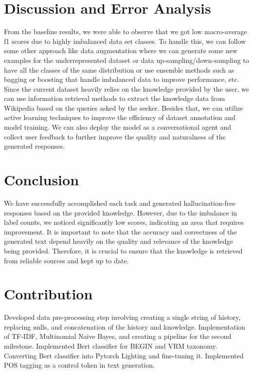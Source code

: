 \documentclass[11pt]{article}
\begin{document}
\section{Discussion and Error Analysis}
From the baseline results, we were able to observe that we got low macro-average f1 scores due to highly imbalanced data set classes. To handle this, we can follow some other approach like data augmentation where we can generate some new examples for the underrepresented dataset or data up-sampling/down-sampling to have all the classes of the same distribution or use ensemble methods such as bagging or boosting that handle imbalanced data to improve performance, etc. Since the current dataset heavily relies on the knowledge provided by the user, we can use information retrieval methods to extract the knowledge data from Wikipedia based on the queries asked by the seeker. Besides that, we can utilize active learning techniques to improve the efficiency of dataset annotation and model training. We can also deploy the model as a conversational agent and collect user feedback to further improve the quality and naturalness of the generated responses.

\section{Conclusion}
We have successfully accomplished each task and generated hallucination-free responses based on the provided knowledge. However, due to the imbalance in label counts, we noticed significantly low scores, indicating an area that requires improvement. It is important to note that the accuracy and correctness of the generated text depend heavily on the quality and relevance of the knowledge being provided. Therefore, it is crucial to ensure that the knowledge is retrieved from reliable sources and kept up to date.

\section{Contribution}
Developed data pre-processing step involving creating a single string of history, replacing nulls, and concatenation of the history and knowledge. Implementation of TF-IDF, Multinomial Naive Bayes, and creating a pipeline for the second milestone. Implemented Bert classifier for BEGIN and VRM taxonomy. Converting Bert classifier into Pytorch Lighting and fine-tuning it. Implemented POS tagging as a control token in text generation.
\end{document}
